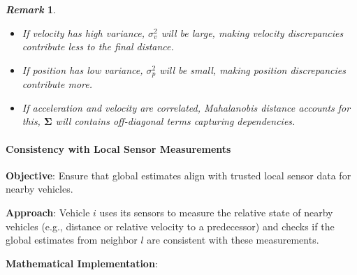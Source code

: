 \documentclass[letterpaper, 10pt, conference]{ieeeconf}  %
\newtheorem{remark}{\it Remark}%
\begin{document}
\begin{remark}
    
\begin{itemize}
    \item If velocity has high variance, \( \sigma^2_v \) will be large, making velocity discrepancies contribute less to the final distance.
    \item If position has low variance, \( \sigma^2_p \) will be small, making position discrepancies contribute more.
    \item If acceleration and velocity are correlated, Mahalanobis distance accounts for this, \( \mathbf{\Sigma} \) will contains off-diagonal terms capturing dependencies.
\end{itemize}
\end{remark}



\paragraph{Consistency with Local Sensor Measurements}\label{local_sensor}

\textbf{Objective}: Ensure that global estimates align with trusted local sensor data for nearby vehicles.

\textbf{Approach}: Vehicle \( i \) uses its sensors to measure the relative state of nearby vehicles (e.g., distance or relative velocity to a predecessor) and checks if the global estimates from neighbor \( l \) are consistent with these measurements.

\textbf{Mathematical Implementation}:
\end{document}

